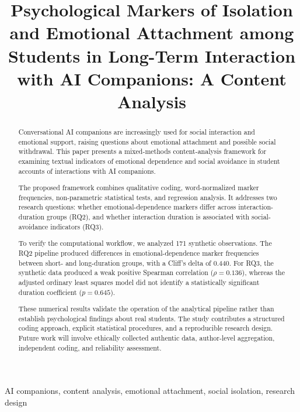 \documentclass[conference]{IEEEtran}
\title{Psychological Markers of Isolation and Emotional Attachment among Students in Long-Term Interaction with AI Companions: A Content Analysis}
\author{
  \IEEEauthorblockN{Anna Merkulova and Adilet Bolat}
  \IEEEauthorblockA{Narxoz University, SCOM3001\\
    Almaty, Kazakhstan\\
    anna.merkulova@narxoz.kz, adilet.bolat@narxoz.kz}
}
\begin{document}
\maketitle



\begin{abstract}
Conversational AI companions are increasingly used for
social interaction and emotional support, raising questions
about emotional attachment and possible social withdrawal.
This paper presents a mixed-methods content-analysis
framework for examining textual indicators of emotional
dependence and social avoidance in student accounts of
interactions with AI companions.

The proposed framework combines qualitative coding,
word-normalized marker frequencies, non-parametric
statistical tests, and regression analysis. It addresses
two research questions: whether emotional-dependence
markers differ across interaction-duration groups (RQ2),
and whether interaction duration is associated with
social-avoidance indicators (RQ3).

To verify the computational workflow, we analyzed
171 synthetic observations. The RQ2 pipeline produced
differences in emotional-dependence marker frequencies
between short- and long-duration groups, with a
Cliff's delta of 0.440. For RQ3, the synthetic data
produced a weak positive Spearman correlation
($\rho=0.136$), whereas the adjusted ordinary least
squares model did not identify a statistically
significant duration coefficient ($p=0.645$).

These numerical results validate the operation of
the analytical pipeline rather than establish
psychological findings about real students.
The study contributes a structured coding approach,
explicit statistical procedures, and a reproducible
research design. Future work will involve ethically
collected authentic data, author-level aggregation,
independent coding, and reliability assessment.
\end{abstract}



\begin{IEEEkeywords}
AI companions, content analysis, emotional attachment, social isolation,
research design
\end{IEEEkeywords}







\balance


\end{document}
